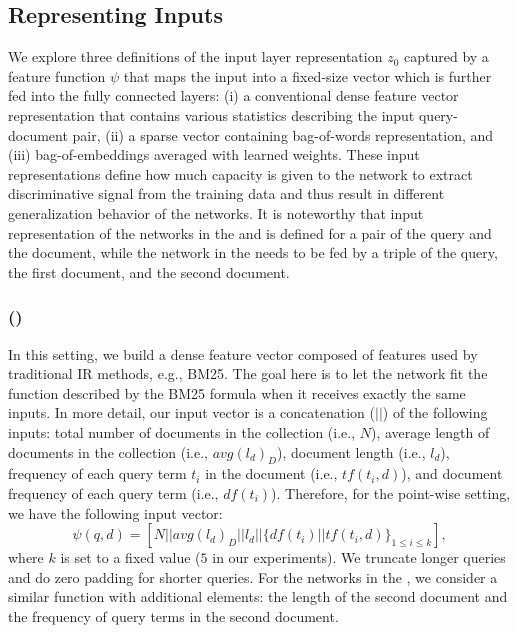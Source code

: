 \subsection{Representing Inputs}
\label{sec:feedings}
We explore three definitions of the input layer representation $z_0$ captured by a feature function $\psi$ that maps the input into a fixed-size vector which is further fed into the fully connected layers: 
(i) a conventional dense feature vector representation that contains various statistics describing the input query-document pair, 
(ii) a sparse vector containing bag-of-words representation, and 
(iii) bag-of-embeddings averaged with learned weights. 
These input representations define how much capacity is given to the network to extract discriminative signal from the training data and thus result in different generalization behavior of the networks. 
It is noteworthy that input representation of the networks in the \modelone and \modeltwo is defined for a pair of the query and the document, while the network in the \modelthree needs to be fed by a triple of the query, the first document, and the second document.

\subsubsection{\Feedone (\fone)} 
In this setting, we build a dense feature vector composed of features used by traditional IR methods, e.g., BM25. The goal here is to let the network fit the function described by the BM25 formula when it receives exactly the same inputs. 
In more detail, our input vector is a concatenation ($||$) of the following inputs: total number of documents in the collection (i.e., $N$), average length of documents in the collection (i.e., $avg(l_d)_D$), document length (i.e., $l_d$), frequency of each query term $t_i$ in the document (i.e., $tf(t_i, d)$), and document frequency of each query term (i.e., $df(t_i)$). Therefore, for the point-wise setting, we have the following input vector:
\begin{equation}
\psi(q, d) = [N || avg(l_d)_D || l_d || \{df(t_i) || tf(t_i,d)\}_{1 \leq i \leq k}],
\end{equation}
where $k$ is set to a fixed value ($5$ in our experiments). 
We truncate longer queries and do zero padding for shorter queries. 
For the networks in the \modelthree, we consider a similar function with additional elements: the length of the second document and the frequency of query terms in the second document.


